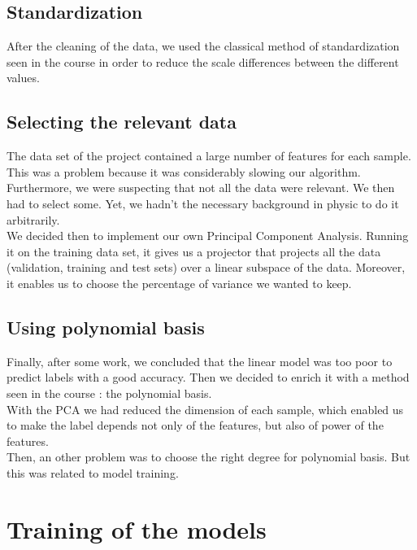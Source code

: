 \documentclass[a4paper, 10pt]{article}
\begin{document}
		\subsection{Standardization}
		
		After the cleaning of the data, we used the classical method of standardization seen in the course in order to reduce the scale differences between the different values. 
		
		\subsection{Selecting the relevant data}
		
		The data set of the project contained a large number of features for each sample. 
		\\ This was a problem because it was considerably slowing our algorithm. 
		\\ Furthermore, we were suspecting that not all the data were relevant. We then had to select some. Yet, we hadn't the necessary background in physic to do it arbitrarily. 
		\\We decided then to implement our own Principal Component Analysis. Running it on the training data set, it gives us a projector that projects all the data (validation, training and test sets) over a linear subspace of the data. Moreover, it enables us to choose the percentage of variance we wanted to keep.
		
		\subsection{Using polynomial basis}
		
		Finally, after some work, we concluded that the linear model was too poor to predict labels with a good accuracy. Then we decided to enrich it with a method seen in the course : the polynomial basis. 
		\\With the PCA we had reduced the dimension of each sample, which enabled us to make the label depends not only of the features, but also of power of the features. 
		\\Then, an other problem was to choose the right degree for polynomial basis. But this was related to model training. 
		
	\section{Training of the models}
	
\end{document}
